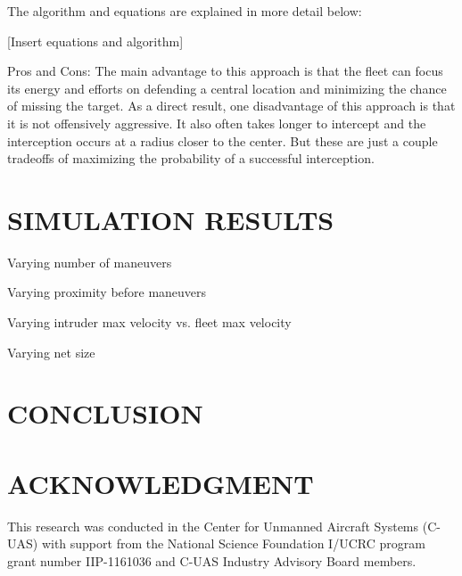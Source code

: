 \documentclass[letterpaper, 10 pt, conference]{ieeeconf}  %
\begin{document}
    The algorithm and equations are explained in more detail below:

[Insert equations and algorithm]

Pros and Cons: The main advantage to this approach is that the fleet can focus its energy and efforts on defending a central location and minimizing the chance of missing the target. As a direct result, one disadvantage of this approach is that it is not offensively aggressive. It also often takes longer to intercept and the interception occurs at a radius closer to the center. But these are just a couple tradeoffs of maximizing the probability of a successful interception.

\section{SIMULATION RESULTS}

Varying number of maneuvers

Varying proximity before maneuvers

Varying intruder max velocity vs. fleet max velocity

Varying net size

\section{CONCLUSION}



\addtolength{\textheight}{-12cm}   %

\section*{ACKNOWLEDGMENT}
This research was conducted in the Center for Unmanned Aircraft Systems (C-UAS) with
support from the National Science Foundation I/UCRC program grant number IIP-1161036 and
C-UAS Industry Advisory Board members.




\end{document}
